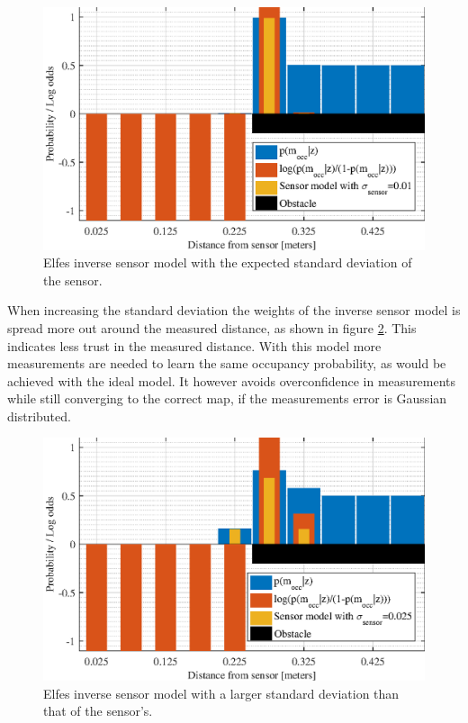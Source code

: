 \begin{figure}
	\centering
	\includegraphics[scale=1.0]{figures/static_mapping/sensor_model_std_dev01}
	\caption{Elfes inverse sensor model with the expected standard deviation of the sensor.}
	\label{fig:sensor_model_std_dev01}
\end{figure}

When increasing the standard deviation the weights of the inverse sensor model is spread more out around the measured distance, as shown in figure \ref{fig:sensor_model_std_dev025}. This indicates less trust in the measured distance. With this model more measurements are needed to learn the same occupancy probability, as would be achieved with the ideal model. It however avoids overconfidence in measurements while still converging to the correct map, if the measurements error is Gaussian distributed.

\begin{figure}
	\centering
	\includegraphics[scale=1.0]{figures/static_mapping/sensor_model_std_dev025}
	\caption{Elfes inverse sensor model with a larger standard deviation than that of the sensor's.}
	\label{fig:sensor_model_std_dev025}
\end{figure}

